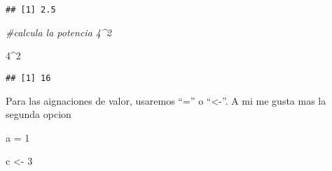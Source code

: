 \documentclass[
]{article}
\newenvironment{Shaded}{\begin{snugshade}}{\end{snugshade}}
\newcommand{\CommentTok}[1]{\textcolor[rgb]{0.56,0.35,0.01}{\textit{#1}}}
\newcommand{\DecValTok}[1]{\textcolor[rgb]{0.00,0.00,0.81}{#1}}
\newcommand{\NormalTok}[1]{#1}
\newcommand{\OtherTok}[1]{\textcolor[rgb]{0.56,0.35,0.01}{#1}}
\newcommand{\SpecialCharTok}[1]{\textcolor[rgb]{0.00,0.00,0.00}{#1}}
\begin{document}
\begin{verbatim}
## [1] 2.5
\end{verbatim}

\begin{Shaded}
\begin{Highlighting}[]
\CommentTok{\#calcula la potencia 4\^{}2}

\DecValTok{4}\SpecialCharTok{\^{}}\DecValTok{2}
\end{Highlighting}
\end{Shaded}

\begin{verbatim}
## [1] 16
\end{verbatim}

Para las aignaciones de valor, usaremos ``='' o ``\textless-''. A mi me
gusta mas la segunda opcion

\begin{Shaded}
\begin{Highlighting}[]
\NormalTok{a }\OtherTok{=} \DecValTok{1}

\NormalTok{c }\OtherTok{\textless{}{-}} \DecValTok{3}
\end{Highlighting}
\end{Shaded}
\end{document}
